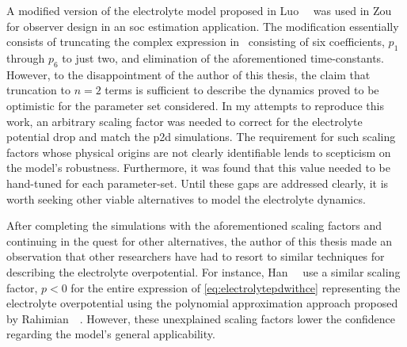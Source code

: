 A modified version of the electrolyte model proposed in Luo~\etal~\cite{Luo2013}
was  used  in Zou~\etal~\cite{Zou2016a}  for  observer  design in  an  \gls{soc}
estimation application. The modification  essentially consists of truncating the
complex  expression  in~\cite{Luo2013}  consisting of  six  coefficients,  $p_1$
through $p_6$ to just two, and elimination of the aforementioned time-constants.
However, to  the disappointment  of the  author of this  thesis, the  claim that
truncation to  $n=2$ terms is sufficient  to describe the dynamics  proved to be
optimistic for  the parameter set considered.  In my attempts to  reproduce this
work, an  arbitrary scaling  factor was  needed to  correct for  the electrolyte
potential drop  and match  the \gls{p2d} simulations.  The requirement  for such
scaling factors  whose physical  origins are not  clearly identifiable  lends to
scepticism on the model's robustness. Furthermore,  it was found that this value
needed to be  hand-tuned for each parameter-set. Until these  gaps are addressed
clearly, it is worth seeking other  viable alternatives to model the electrolyte
dynamics.

After  completing  the  simulations  with  the  aforementioned  scaling  factors
and  continuing  in  the  quest  for other  alternatives,  the  author  of  this
thesis  made  an observation  that  other  researchers  have  had to  resort  to
similar techniques  for describing the electrolyte  overpotential. For instance,
Han~\etal~\cite{Han2015a} use  a similar  scaling factor,  $p<0$ for  the entire
expression   of  \cref{eq:electrolytepdwithce}   representing  the   electrolyte
overpotential   using  the   polynomial  approximation   approach  proposed   by
Rahimian~\etal~\cite{KhaleghiRahimian2013}.  However, these  unexplained scaling
factors lower the confidence regarding the model's general applicability.


